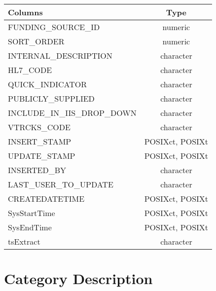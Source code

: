 \documentclass[
  letterpaper,
  DIV=11,
  numbers=noendperiod]{scrreprt}
\begin{document}
\begin{longtable}{lc}
\toprule
Columns & Type \\ 
\midrule
FUNDING\_SOURCE\_ID & numeric \\ 
SORT\_ORDER & numeric \\ 
INTERNAL\_DESCRIPTION & character \\ 
HL7\_CODE & character \\ 
QUICK\_INDICATOR & character \\ 
PUBLICLY\_SUPPLIED & character \\ 
INCLUDE\_IN\_IIS\_DROP\_DOWN & character \\ 
VTRCKS\_CODE & character \\ 
INSERT\_STAMP & POSIXct, POSIXt \\ 
UPDATE\_STAMP & POSIXct, POSIXt \\ 
INSERTED\_BY & character \\ 
LAST\_USER\_TO\_UPDATE & character \\ 
CREATEDATETIME & POSIXct, POSIXt \\ 
SysStartTime & POSIXct, POSIXt \\ 
SysEndTime & POSIXct, POSIXt \\ 
tsExtract & character \\ 
\bottomrule
\end{longtable}

\hypertarget{category-description-48}{%
\section*{Category Description}\label{category-description-48}}
\end{document}
